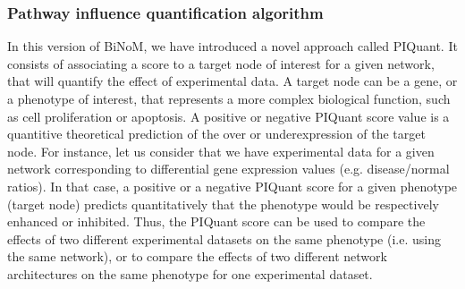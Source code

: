 \documentclass[10pt]{bmc_article}
\newenvironment{bmcformat}{\baselineskip20pt\sloppy\setboolean{publ}{false}}{\baselineskip20pt\sloppy}
\begin{document}
\begin{bmcformat}
\subsubsection*{Pathway influence quantification algorithm}

In this version of BiNoM, we have introduced a novel approach called PIQuant. It consists of associating a score to a
target node of interest for a given network, that will quantify the effect of
experimental data.
A target node can be a gene, or a phenotype of interest, that represents a more complex
biological function, such as cell proliferation or apoptosis.
A positive or negative PIQuant score value is a quantitive theoretical
prediction of the over or underexpression of
the target node. For instance, let us consider that we have experimental data for a given network
 corresponding to differential gene expression values (e.g.
disease/normal ratios).
In that case, a positive or a negative PIQuant score for a given phenotype
(target node) predicts quantitatively
that the phenotype would be respectively enhanced or inhibited.
Thus, the PIQuant score can be used to
compare the effects of two different experimental datasets on the same phenotype
(i.e. using the same network), or to compare the effects of two different network
architectures on the same phenotype for one experimental dataset.



\end{bmcformat}
\end{document}
